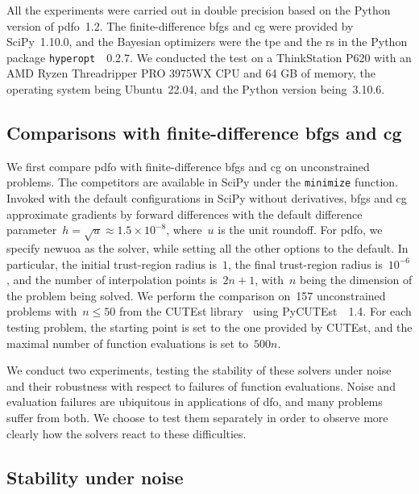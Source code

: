 \documentclass[
    smallextended,  %
    final,          %
]{svjour3}
\begin{document}
All the experiments were carried out in double precision based on the Python version of \gls{pdfo}~1.2.
The finite-difference \gls{bfgs} and \gls{cg} were provided by SciPy~1.10.0,
and the Bayesian optimizers were the \gls{tpe} and the \gls{rs} in the Python package
\texttt{hyperopt}~\cite{Bergstra_Yamins_Cox_2013}~0.2.7.
We conducted the test on a ThinkStation P620 with an AMD Ryzen Threadripper
PRO 3975WX CPU and 64 GB of memory, the operating system being Ubuntu~22.04, and the Python version
being~3.10.6.


\subsection{Comparisons with finite-difference \gls{bfgs} and \gls{cg}}
\label{ssec:fd}

We first compare \gls{pdfo} with finite-difference \gls{bfgs} and \gls{cg} on unconstrained
problems. The competitors are available in SciPy under the \texttt{minimize} function.
Invoked with the default configurations in SciPy without derivatives,
\gls{bfgs} and \gls{cg} approximate gradients by forward differences with the default difference
parameter~$h = \sqrt{u} \approx 1.5\times 10^{-8}$, where~$u$ is the unit roundoff.
For \gls{pdfo}, we specify \gls{newuoa} as the solver, while setting all the other options to the default.
In particular, the initial trust-region radius is~$1$, the final trust-region radius is~$10^{-6}$,
and the number of interpolation points is~$2n + 1$, with~$n$ being the dimension of the problem
being solved.
We perform the comparison on~157 unconstrained problems with~$n \le 50$ from the CUTEst
library~\cite{Gould_Orban_Toint_2015} using PyCUTEst~\cite{Fowkes_Roberts_Burmen_2022}~1.4.
For each testing problem, the starting point is set to the one provided by CUTEst, and the maximal
number of function evaluations is set to~$500n$.


We conduct two experiments, testing the stability of these solvers under noise and their robustness
with respect to failures of function evaluations. Noise and evaluation failures are ubiquitous in
applications of \gls{dfo}, and many problems suffer from both. We choose to test them separately in
order to observe more clearly how the solvers react to these difficulties.

\subsection{Stability under noise}
\end{document}
